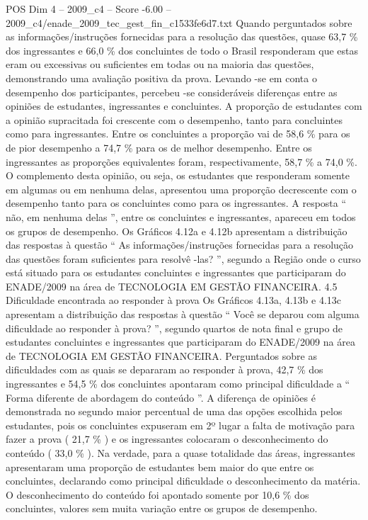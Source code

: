 \begin{textsample}{POS Dim 4 – 2009\_c4 – Score -6.00 – 2009\_c4/enade\_2009\_tec\_gest\_fin\_c1533fe6d7.txt}
Quando perguntados sobre as informações/instruções fornecidas para a resolução das questões, quase 63,7 \% dos ingressantes e 66,0 \% dos concluintes de todo o Brasil responderam que estas eram ou excessivas ou suficientes em todas ou na maioria das questões, demonstrando uma avaliação positiva da prova.
Levando -se em conta o desempenho dos participantes, percebeu -se consideráveis diferenças entre as opiniões de estudantes, ingressantes e concluintes.
A proporção de estudantes com a opinião supracitada foi crescente com o desempenho, tanto para concluintes como para ingressantes.
Entre os concluintes a proporção vai de 58,6 \% para os de pior desempenho a 74,7 \% para os de melhor desempenho.
Entre os ingressantes as proporções equivalentes foram, respectivamente, 58,7 \% a 74,0 \%.
O complemento desta opinião, ou seja, os estudantes que responderam somente em algumas ou em nenhuma delas, apresentou uma proporção decrescente com o desempenho tanto para os concluintes como para os ingressantes.
A resposta “ não, em nenhuma delas ”, entre os concluintes e ingressantes, apareceu em todos os grupos de desempenho.
Os Gráficos 4.12a e 4.12b apresentam a distribuição das respostas à questão “ As informações/instruções fornecidas para a resolução das questões foram suficientes para resolvê -las? ”, segundo a Região onde o curso está situado para os estudantes concluintes e ingressantes que participaram do ENADE/2009 na área de TECNOLOGIA EM GESTÃO FINANCEIRA. 4.5 Dificuldade encontrada ao responder à prova Os Gráficos 4.13a, 4.13b e 4.13c apresentam a distribuição das respostas à questão “ Você se deparou com alguma dificuldade ao responder à prova? ”, segundo quartos de nota final e grupo de estudantes concluintes e ingressantes que participaram do ENADE/2009 na área de TECNOLOGIA EM GESTÃO FINANCEIRA.
Perguntados sobre as dificuldades com as quais se depararam ao responder à prova, 42,7 \% dos ingressantes e 54,5 \% dos concluintes apontaram como principal dificuldade a “ Forma diferente de abordagem do conteúdo ”.
A diferença de opiniões é demonstrada no segundo maior percentual de uma das opções escolhida pelos estudantes, pois os concluintes expuseram em 2º lugar a falta de motivação para fazer a prova ( 21,7 \% ) e os ingressantes colocaram o desconhecimento do conteúdo ( 33,0 \% ).
Na verdade, para a quase totalidade das áreas, ingressantes apresentaram uma proporção de estudantes bem maior do que entre os concluintes, declarando como principal dificuldade o desconhecimento da matéria.
O desconhecimento do conteúdo foi apontado somente por 10,6 \% dos concluintes, valores sem muita variação entre os grupos de desempenho.

\end{textsample}
